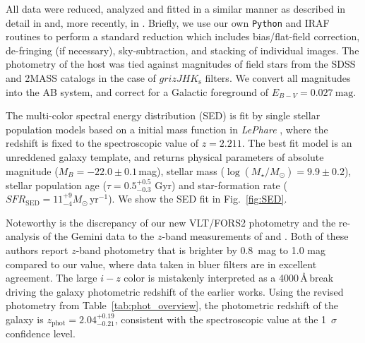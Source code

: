 \documentclass{aa}    %
\begin{document}
All data were reduced, analyzed and fitted in a similar manner as described in detail in
\citet{Kruhler2011a} and, more recently, in \citet{Schulze2016}. Briefly, we use our own
\texttt{Python} and IRAF routines to perform a standard reduction which includes
bias/flat-field correction, de-fringing (if necessary), sky-subtraction, and
stacking of individual images. The photometry of the host was tied against magnitudes 
of field stars from the SDSS and 2MASS catalogs in the case of $grizJHK_{\mathrm{s}}$ filters. 
We convert all magnitudes into the AB system, and correct for a Galactic 
foreground of $E_{B-V}=0.027~\mathrm{mag}$.

The multi-color spectral energy distribution (SED) is fit by \citet{Bruzual2003}
single stellar population models based on a \citet{Chabrier2003} initial mass
function in \emph{LePhare} \citep{Ilbert2006}, where the redshift is fixed to
the spectroscopic value of $z=2.211$. The best fit model is an
unreddened galaxy template, and returns physical parameters of absolute
magnitude ($M_B=-22.0\pm0.1$\,mag), stellar mass ($\log(M_{\star}/M_\odot) =
9.9\pm0.2$), stellar population age ($\tau = 0.5_{-0.3}^{+0.5}$ Gyr) and
star-formation rate ($SFR_{\mathrm{SED}}=11_{-4}^{+9}
M_\odot\,\mathrm{yr}^{-1}$). We show the SED fit in Fig.~\ref{fig:SED}.

Noteworthy is the discrepancy of our new VLT/FORS2 photometry and the
re-analysis of the Gemini data to the $z$-band measurements of \citet{Margutti2012} and
\citet{Sakamoto2013}. Both of these authors report $z$-band photometry that is brighter 
by 0.8~mag to 1.0 mag compared to our value, where data taken in bluer filters are in excellent agreement. The large $i-z$ color is mistakenly interpreted as a 4000\,\AA\,break
driving the galaxy photometric redshift of the earlier works. Using
the revised photometry from Table~\ref{tab:phot_overview}, the photometric redshift of the
galaxy is $z_{\mathrm{phot}}=2.04_{-0.21}^{+0.19}$, consistent with the
spectroscopic value at the 1~$\sigma$ confidence level.

\end{document}
